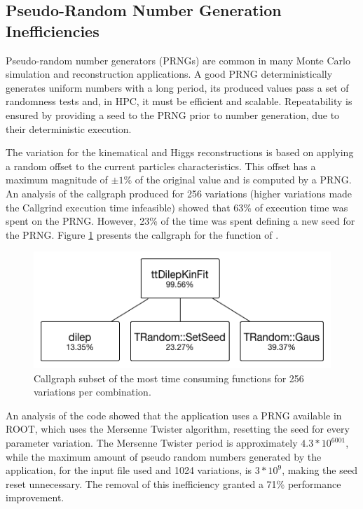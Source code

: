 \subsection{Pseudo-Random Number Generation Inefficiencies}

Pseudo-random number generators (PRNGs) are common in many Monte Carlo simulation and reconstruction applications. A good PRNG deterministically generates uniform numbers with a long period, its produced values pass a set of randomness tests and, in HPC, it must be efficient and scalable. Repeatability is ensured by providing a seed to the PRNG prior to number generation, due to their deterministic execution.

The variation for the kinematical and Higgs reconstructions is based on applying a random offset to the current particles characteristics. This offset has a maximum magnitude of $\pm1\%$ of the original value and is computed by a PRNG. An analysis of the callgraph produced for 256 variations (higher variations made the Callgrind execution time infeasible) showed that 63\% of \tth execution time was spent on the PRNG. However, 23\% of the time was spent defining a new seed for the PRNG. Figure \ref{fig:prng256} presents the callgraph for the \ttDilepKinFit function of \tth.

\begin{figure}[!htp]
	\begin{center}
		\includegraphics[scale=0.5]{images/prng_256_edited.png}
		\caption{Callgraph subset of the \ttDilepKinFit most time consuming functions for 256 variations per combination.}
		\label{fig:prng256}
	\end{center}
\end{figure}

An analysis of the code showed that the application uses a PRNG available in ROOT, which uses the Mersenne Twister algorithm\cite{MersenneTwister}, resetting the seed for every parameter variation. The Mersenne Twister period is approximately $4.3 * 10^{6001}$, while the maximum amount of pseudo random numbers generated by the application, for the input file used and 1024 variations, is $3 * 10^9$, making the seed reset unnecessary. The removal of this inefficiency granted a 71\% performance improvement.

